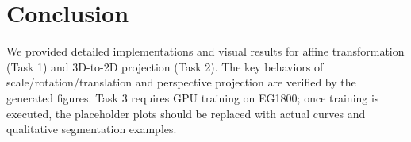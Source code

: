 \documentclass[final]{cvpr}
\begin{document}
\section{Conclusion}
We provided detailed implementations and visual results for affine transformation (Task 1) and 3D-to-2D projection (Task 2). The key behaviors of scale/rotation/translation and perspective projection are verified by the generated figures. Task 3 requires GPU training on EG1800; once training is executed, the placeholder plots should be replaced with actual curves and qualitative segmentation examples.

{\small


}
\end{document}
